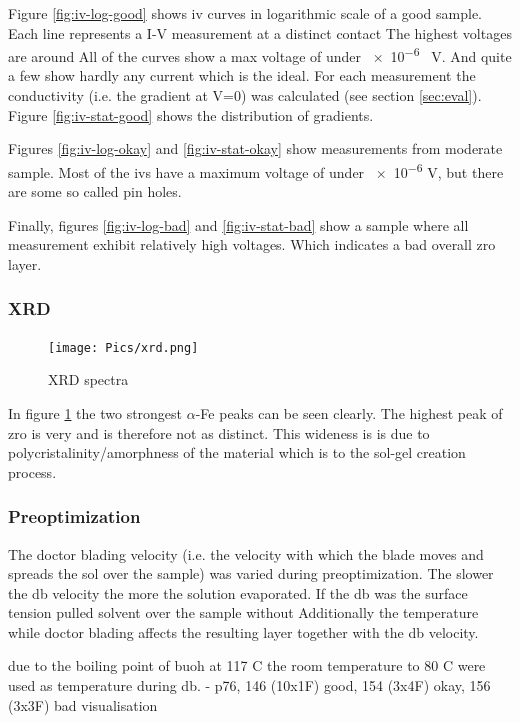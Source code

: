 Figure \ref{fig:iv-log-good} shows \gls{iv} curves in logarithmic scale of a good sample. 
Each line represents a I-V measurement at a distinct contact 
The highest voltages are around 
All of the curves show a max voltage of under \num{e-6} \SI{}{\volt}. 
And quite a few show hardly any current which is the ideal. 
For each measurement the conductivity (i.e. the gradient at V=0) was calculated (see section \ref{sec:eval}). 
Figure \ref{fig:iv-stat-good} shows the distribution of gradients. 

Figures \ref{fig:iv-log-okay} and \ref{fig:iv-stat-okay} show measurements from moderate sample. 
Most of the \gls{iv}s have a maximum voltage of under \num{e-6} V, but there are some so called pin holes. 

Finally, figures \ref{fig:iv-log-bad} and \ref{fig:iv-stat-bad} show a sample where all 
measurement exhibit relatively high voltages. Which indicates a bad overall \gls{zro} layer. 

\subsubsection{XRD}
\begin{figure}
	\centering
	\texttt{[image: Pics/xrd.png]}
	\caption{XRD spectra}
	\label{fig:xrd}
\end{figure}

In figure \ref{fig:xrd} the two strongest $\alpha$-Fe peaks can be seen clearly. 
The highest peak of \gls{zro} is very  and is therefore not as distinct. 
This wideness is is due to polycristalinity/amorphness of the material which is  to the sol-gel creation process. 

\subsubsection{Preoptimization}
The doctor blading velocity (i.e. the velocity with which the blade moves and spreads the sol over the sample) 
was varied during preoptimization. 
The slower the \gls{db} velocity the more  the solution evaporated. 
If the \gls{db} was  the surface tension pulled solvent over the sample without 
Additionally the temperature while doctor blading affects the resulting layer together with the \gls{db} velocity. 

due to the boiling point of \gls{buoh} at 117 C\cite{ncbi1butanol} the room temperature to 80 C were used as temperature during \gls{db}.
- p76, 146 (10x1F) good, 154 (3x4F) okay, 156 (3x3F) bad visualisation

